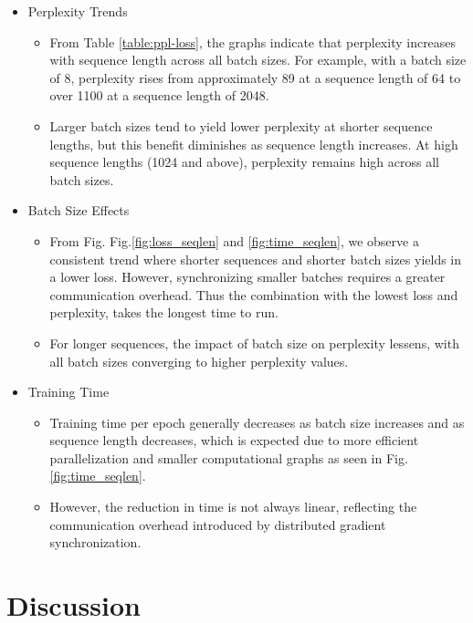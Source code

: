 \documentclass[conference]{IEEEtran}
\begin{document}
\begin{itemize}
    \item Perplexity Trends
    \begin{itemize}
        \item From Table \ref{table:ppl-loss}, the graphs indicate that perplexity increases with sequence length across all batch sizes. For example, with a batch size of 8, perplexity rises from approximately 89 at a sequence length of 64 to over 1100 at a sequence length of 2048.
        \item Larger batch sizes tend to yield lower perplexity at shorter sequence lengths, but this benefit diminishes as sequence length increases. At high sequence lengths (1024 and above), perplexity remains high across all batch sizes.
    \end{itemize}
    \item Batch Size Effects
    \begin{itemize}
        \item From Fig. Fig.\ref{fig:loss_seqlen} and \ref{fig:time_seqlen}, we observe a consistent trend where shorter sequences and shorter batch sizes yields in a lower loss. However, synchronizing smaller batches requires a greater communication overhead. Thus the combination with the lowest loss and perplexity, takes the longest time to run.
        \item For longer sequences, the impact of batch size on perplexity lessens, with all batch sizes converging to higher perplexity values.
    \end{itemize}
    \item Training Time
    \begin{itemize}
        \item Training time per epoch generally decreases as batch size increases and as sequence length decreases, which is expected due to more efficient parallelization and smaller computational graphs as seen in Fig.\ref{fig:time_seqlen}.
        \item However, the reduction in time is not always linear, reflecting the communication overhead introduced by distributed gradient synchronization.
    \end{itemize}
\end{itemize}



\section{Discussion}
\end{document}
